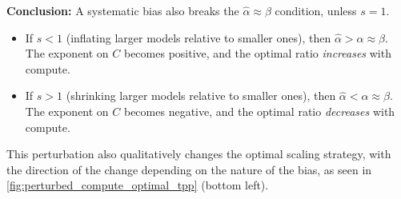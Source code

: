 \textbf{Conclusion:} A systematic bias also breaks the $\hat{\alpha} \approx \beta$ condition, unless $s=1$.
\begin{itemize}
    \item If $s < 1$ (inflating larger models relative to smaller ones), then $\hat{\alpha} > \alpha \approx \beta$. The exponent on $C$ becomes positive, and the optimal ratio \textit{increases} with compute.
    \item If $s > 1$ (shrinking larger models relative to smaller ones), then $\hat{\alpha} < \alpha \approx \beta$. The exponent on $C$ becomes negative, and the optimal ratio \emph{decreases} with compute.
\end{itemize}
This perturbation also qualitatively changes the optimal scaling strategy, with the direction of the change depending on the nature of the bias, as seen in \cref{fig:perturbed_compute_optimal_tpp} (bottom left).

\clearpage